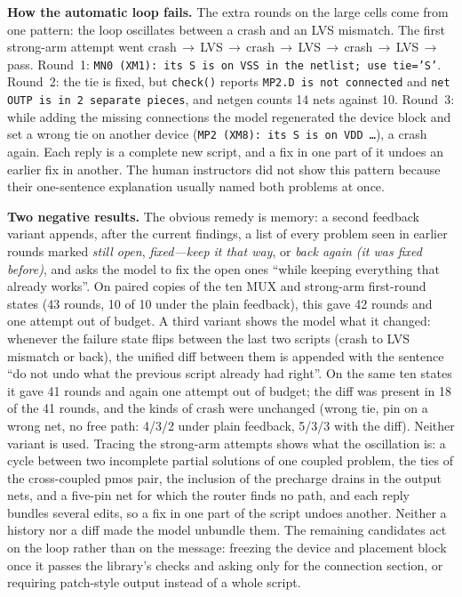 \documentclass[conference]{IEEEtran}
\newcommand{\code}[1]{\texttt{#1}}
\begin{document}
\textbf{How the automatic loop fails.} The extra rounds on the large cells come from one pattern: the loop oscillates between a crash and an LVS mismatch. The first strong-arm attempt went crash\,$\rightarrow$\,LVS\,$\rightarrow$\,crash\,$\rightarrow$\,LVS\,$\rightarrow$\,crash\,$\rightarrow$\,LVS\,$\rightarrow$\,pass. Round~1: \code{MN0 (XM1): its S is on VSS in the netlist; use tie='S'}. Round~2: the tie is fixed, but \code{check()} reports \code{MP2.D is not connected} and \code{net OUTP is in 2 separate pieces}, and netgen counts 14 nets against 10. Round~3: while adding the missing connections the model regenerated the device block and set a wrong tie on another device (\code{MP2 (XM8): its S is on VDD \ldots}), a crash again. Each reply is a complete new script, and a fix in one part of it undoes an earlier fix in another. The human instructors did not show this pattern because their one-sentence explanation usually named both problems at once.

\textbf{Two negative results.} The obvious remedy is memory: a second feedback variant appends, after the current findings, a list of every problem seen in earlier rounds marked \emph{still open}, \emph{fixed---keep it that way}, or \emph{back again (it was fixed before)}, and asks the model to fix the open ones ``while keeping everything that already works''. On paired copies of the ten MUX and strong-arm first-round states (43 rounds, 10 of 10 under the plain feedback), this gave 42 rounds and one attempt out of budget. A third variant shows the model what it changed: whenever the failure state flips between the last two scripts (crash to LVS mismatch or back), the unified diff between them is appended with the sentence ``do not undo what the previous script already had right''. On the same ten states it gave 41 rounds and again one attempt out of budget; the diff was present in 18 of the 41 rounds, and the kinds of crash were unchanged (wrong tie, pin on a wrong net, no free path: 4/3/2 under plain feedback, 5/3/3 with the diff). Neither variant is used. Tracing the strong-arm attempts shows what the oscillation is: a cycle between two incomplete partial solutions of one coupled problem, the ties of the cross-coupled pmos pair, the inclusion of the precharge drains in the output nets, and a five-pin net for which the router finds no path, and each reply bundles several edits, so a fix in one part of the script undoes another. Neither a history nor a diff made the model unbundle them. The remaining candidates act on the loop rather than on the message: freezing the device and placement block once it passes the library's checks and asking only for the connection section, or requiring patch-style output instead of a whole script.
\end{document}
